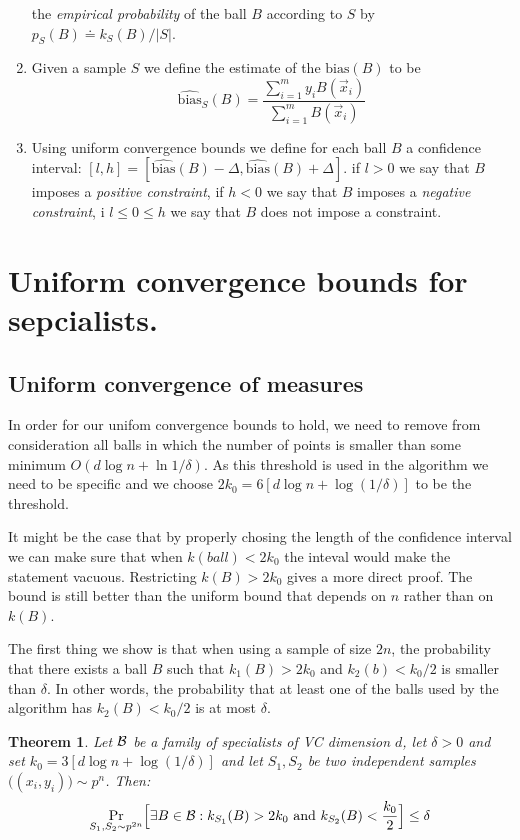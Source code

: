 \documentclass{article}
\newtheorem{theorem}{Theorem}[section]
\newcommand{\B}{{\cal B}}
\newcommand{\x}{\vec{x}}
\newcommand{\bias}{\text{bias}}
\newcommand{\ebias}{\widehat{\text{bias}}}
\newcommand{\samp}{S}
\begin{document}
\begin{enumerate}
    the {\em empirical probability} of the ball $B$ according to
    $\samp$ by $p_{\samp}(B) \doteq k_{\samp}(B)/|\samp|$.
  \item Given a sample $\samp$ we define the estimate of the
    $\bias(B)$ to be
    \[
    \ebias_{\samp}(B) = \frac{\sum_{i=1}^m y_i B(\x_i)}{\sum_{i=1}^m B(\x_i)}
    \]
  \item Using uniform convergence bounds we define for each ball $B$
    a confidence interval:
    $[l,h]=[\ebias(B)-\Delta,\ebias(B)+\Delta]$.
    if $l>0$ we say that $B$ imposes a {\em positive constraint}, if
    $h<0$ we say that $B$ imposes a {\em negative constraint}, i
    $l\leq 0 \leq h$ we say that $B$ does not impose a constraint.
\end{enumerate}

\section{Uniform convergence bounds for sepcialists.}
\subsection{Uniform convergence of measures}

In order for our unifom convergence bounds to hold, we need to remove
from consideration all balls in which the number of points is smaller
than some minimum $O(d \log n + \ln 1/\delta)$. As this threshold is
used in the algorithm we need to be specific and we choose
$2k_0=6\left[  d \log n + \log(1/\delta) \right]$ to be the threshold.

It might be the case that by properly chosing the length of the
confidence interval we can make sure that when $k(ball)<2k_0$ the
inteval would make the statement vacuous. Restricting $k(B)>2k_0$
gives a more direct proof. The bound is still better than the uniform
bound that depends on $n$ rather than on $k(B)$.

The first thing we show is that when using a sample of size $2n$, the
probability that there exists a ball $B$ such that $k_1(B)>2k_0$ and
$k_2(b)<k_0/2$ is smaller than $\delta$. In other words, the
probability that at least one of the balls used by the algorithm has
$k_2(B)<k_0/2$ is at most $\delta$.

\begin{theorem}\label{thm:uc1}
Let $\B$ be a family of specialists of VC dimension $d$,
let $\delta>0$ and set $k_0=3\left[  d \log n + \log(1/\delta) \right]$
and let $S_1,S_2$ be two independent samples $\bigl((x_i,y_i)\bigr) \sim p^n$. Then:
\[\Pr_{\samp_1,\samp_2 \sim p^{2n}}\Bigl[\exists {B\in\B}:
  k_{\samp_1}(B)>2k_0 \mbox{ and } k_{\samp_2}(B) < \frac{k_0}{2} \Bigr] \leq \delta
\]
\end{theorem}
\end{document}
